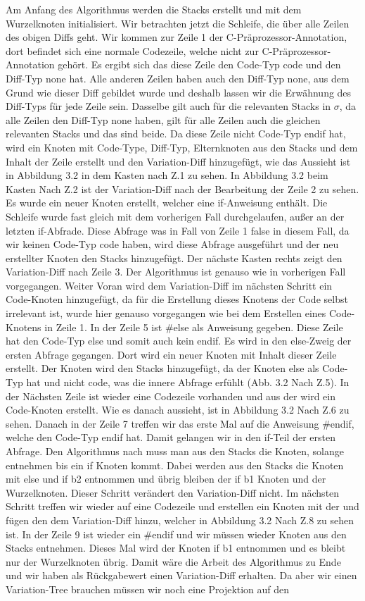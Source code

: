 Am Anfang des Algorithmus werden die Stacks erstellt und mit dem Wurzelknoten  initialisiert. Wir betrachten jetzt die Schleife, die über alle Zeilen des obigen Diffs geht. Wir kommen zur Zeile 1 der C-Präprozessor-Annotation, dort befindet sich eine normale Codezeile, welche nicht zur C-Präprozessor-Annotation gehört. Es ergibt sich das diese Zeile den Code-Typ code und den Diff-Typ none hat. Alle anderen Zeilen haben auch den Diff-Typ none, aus dem Grund wie dieser Diff gebildet wurde und deshalb lassen wir die Erwähnung des Diff-Typs für jede Zeile sein. Dasselbe gilt auch für die relevanten Stacks in $\sigma$, da alle Zeilen den Diff-Typ none haben, gilt für alle Zeilen auch die gleichen relevanten Stacks und das sind beide. Da diese Zeile nicht Code-Typ endif hat, wird ein Knoten mit Code-Type, Diff-Typ, Elternknoten aus den Stacks und dem Inhalt der Zeile erstellt und den Variation-Diff hinzugefügt, wie das Aussieht ist in Abbildung 3.2 in dem Kasten nach Z.1 zu sehen. In Abbildung 3.2 beim Kasten Nach Z.2 ist der Variation-Diff nach der Bearbeitung der Zeile 2 zu sehen. Es wurde ein neuer Knoten erstellt, welcher eine if-Anweisung enthält. Die Schleife wurde fast gleich mit dem vorherigen Fall durchgelaufen, außer an der letzten if-Abfrade. Diese Abfrage was in Fall von Zeile 1 false in diesem Fall, da wir keinen Code-Typ code haben, wird diese Abfrage ausgeführt und der neu erstellter Knoten den Stacks hinzugefügt. Der nächste Kasten rechts zeigt den Variation-Diff nach Zeile 3. Der Algorithmus ist genauso wie in vorherigen Fall vorgegangen. Weiter Voran wird dem Variation-Diff im nächsten Schritt ein Code-Knoten hinzugefügt, da für die Erstellung dieses Knotens der Code selbst irrelevant ist, wurde hier genauso vorgegangen wie bei dem Erstellen eines Code-Knotens in Zeile 1. In der Zeile 5 ist \#else als Anweisung gegeben. Diese Zeile hat den Code-Typ else und somit auch kein endif. Es wird in den else-Zweig der ersten Abfrage gegangen. Dort wird ein neuer Knoten mit Inhalt dieser Zeile erstellt. Der Knoten wird den Stacks hinzugefügt, da der Knoten else  als Code-Typ hat und nicht code, was die innere Abfrage erfühlt (Abb. 3.2 Nach Z.5). In der Nächsten Zeile ist wieder eine Codezeile vorhanden und aus der wird ein Code-Knoten erstellt. Wie es danach aussieht, ist in Abbildung 3.2 Nach Z.6 zu sehen. Danach in der Zeile 7 treffen wir das erste Mal auf die Anweisung \#endif, welche den Code-Typ endif hat. Damit gelangen wir in den if-Teil der ersten Abfrage. Den Algorithmus nach muss man aus den Stacks die Knoten, solange entnehmen bis ein if Knoten kommt. Dabei werden aus den Stacks die Knoten mit else und if b2 entnommen und übrig bleiben der if b1 Knoten und der Wurzelknoten. Dieser Schritt verändert den Variation-Diff nicht. Im nächsten Schritt treffen wir wieder auf eine Codezeile und erstellen ein Knoten mit der und fügen den dem Variation-Diff hinzu, welcher in Abbildung 3.2 Nach Z.8 zu sehen ist. In der Zeile 9 ist wieder ein \#endif und wir müssen wieder Knoten aus den Stacks entnehmen. Dieses Mal wird der Knoten if b1 entnommen und es bleibt nur der Wurzelknoten übrig. Damit wäre die Arbeit des Algorithmus zu Ende und wir haben als Rückgabewert einen Variation-Diff erhalten. Da aber wir einen Variation-Tree brauchen müssen wir noch eine Projektion auf den 